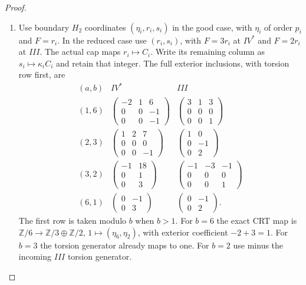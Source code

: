 \begin{proof}
\begin{enumerate}[label=\arabic*.]
\item Use boundary $H_2$ coordinates $(\eta_i,r_i,s_i)$ in the good
case, with $\eta_i$ of order $p_i$ and $F=r_i$.
In the reduced case use $(r_i,s_i)$, with $F=3r_i$ at $IV^*$
and $F=2r_i$ at $III$. The actual cap maps $r_i\mapsto C_i$.
Write its remaining column as $s_i\mapsto\kappa_iC_i$ and
retain that integer.
The full exterior inclusions, with torsion row first, are
\[
\begin{array}{c|c|c}
(a,b)&IV^*&III\\ \hline
(1,6)&\begin{pmatrix}-2&1&6\\0&0&-1\\0&0&-1\end{pmatrix}
 &\begin{pmatrix}3&1&3\\0&0&0\\0&0&1\end{pmatrix}\\[5pt]
(2,3)&\begin{pmatrix}1&2&7\\0&0&0\\0&0&-1\end{pmatrix}
 &\begin{pmatrix}1&0\\0&-1\\0&2\end{pmatrix}\\[5pt]
(3,2)&\begin{pmatrix}-1&18\\0&1\\0&3\end{pmatrix}
 &\begin{pmatrix}-1&-3&-1\\0&0&0\\0&0&1\end{pmatrix}\\[5pt]
(6,1)&\begin{pmatrix}0&-1\\0&3\end{pmatrix}
 &\begin{pmatrix}0&-1\\0&2\end{pmatrix}.
\end{array}                                                     \tag{F46.15}
\]
The first row is taken modulo $b$ when $b>1$.
For $b=6$ the exact CRT map is
$\mathbb Z/6\to\mathbb Z/3\oplus\mathbb Z/2$,
$1\mapsto(\eta_6,\eta_2)$, with exterior coefficient
$-2+3=1$. For $b=3$ the torsion generator already maps to one.
For $b=2$ use minus the incoming $III$ torsion generator.


\end{enumerate}
\end{proof}
